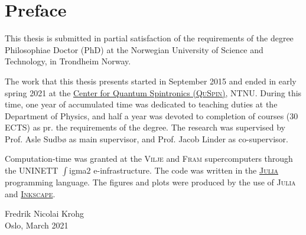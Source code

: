 \chapter*{Preface}\noindent

This thesis is submitted in partial satisfaction of the requirements of the degree Philosophiae Doctor (PhD) at the
Norwegian University of Science and Technology, in Trondheim Norway.

The work that this thesis presents started in September 2015 and ended in early spring 2021 at the
\href{https://www.ntnu.edu/quspin/center-for-quantum-spintronics}{Center for Quantum Spintronics (\textsc{QuSpin})}, \textsc{NTNU}. During this time, one
year of accumulated time was dedicated to teaching duties at the Department of Physics, and half a year
was devoted to completion of courses (30 ECTS) as pr. the requirements of the degree.
The research was supervised by
Prof. Asle Sudb{\o} as main supervisor, and Prof. Jacob Linder as co-supervisor.

Computation-time was granted at the \textsc{Vilje} and \textsc{Fram} supercomputers through the UNINETT $\int$igma$2$ e-infrastructure. The code was written in
the \href{https://julialang.org/}{\textsc{Julia}} programming language. The figures and plots were produced by the use of \textsc{Julia} and
\href{https://inkscape.org/}{\textsc{Inkscape}}.

\vspace{2cm}

\noindent Fredrik Nicolai Krohg\\
Oslo, March 2021
